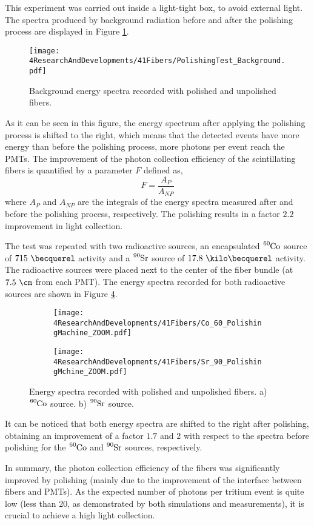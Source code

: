 This experiment was carried out inside a light-tight box, to avoid external light. The spectra produced by background radiation before and after the polishing process are displayed in Figure \ref{fig:ResultsOfPolishingMachineBackground}.
\begin{figure}[]
\centering
\texttt{[image: 4ResearchAndDevelopments/41Fibers/PolishingTest\_Background.pdf]}
\caption{Background energy spectra recorded with polished and unpolished fibers.\label{fig:ResultsOfPolishingMachineBackground}}
\end{figure}
As it can be seen in this figure, the energy spectrum after applying the polishing process is shifted to the right, which means that the detected events have more energy than before the polishing process, more photons per event reach the PMTs. The improvement of the photon collection efficiency of the scintillating fibers is quantified by a parameter $F$ defined as,
\begin{equation}
F=\frac{A_{P}}{A_{NP}}
\label{eq:RelativeImprovement}
\end{equation}
where $A_{P}$ and $A_{NP}$ are the integrals of the energy spectra measured after and before the polishing process, respectively. The polishing results in a factor $2.2$ improvement in light collection. 

The test was repeated with two radioactive sources, an encapsulated $\ce{^{60}Co}$ source of $715~\becquerel$ activity and a $\ce{^{90}Sr}$ source of $17.8~\kilo\becquerel$ activity. The radioactive sources were placed next to the center of the fiber bundle (at $7.5~\cm$ from each PMT). The energy spectra recorded for both radioactive sources are shown in Figure \ref{fig:ResultsOfPolishingMachineSources}.
\begin{figure}
\centering
    \begin{subfigure}[b]{1\textwidth}
    \centering
    \texttt{[image: 4ResearchAndDevelopments/41Fibers/Co\_60\_PolishingMachine\_ZOOM.pdf]}  
    \caption{\label{subfig:EnergySpectrumCo60PolishingTest}}
    \end{subfigure}
    \hfill
    \begin{subfigure}[b]{1\textwidth}
    \centering
    \texttt{[image: 4ResearchAndDevelopments/41Fibers/Sr\_90\_PolishingMchine\_ZOOM.pdf]}  
    \caption{\label{subfig:EnergySpectrumSr90PolishingTest}}
    \end{subfigure}
 \caption{Energy spectra recorded with polished and unpolished fibers. a) $\ce{^{60}Co}$ source. b) $\ce{^{90}Sr}$ source.}
 \label{fig:ResultsOfPolishingMachineSources}
\end{figure}
It can be noticed that both energy spectra are shifted to the right after polishing, obtaining an improvement of a factor $1.7$ and $2$ with respect to the spectra before polishing for the $\ce{^{60}Co}$ and $\ce{^{90}Sr}$ sources, respectively. 

In summary, the photon collection efficiency of the fibers was significantly improved by polishing (mainly due to the improvement of the interface between fibers and PMTs). As the expected number of photons per tritium event is quite low (less than 20, as demonstrated by both simulations and measurements), it is crucial to achieve a high light collection.